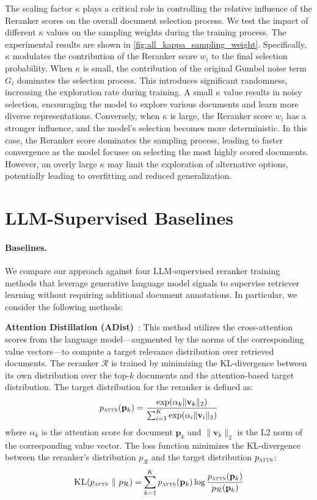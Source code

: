 The scaling factor \(\kappa\) plays a critical role in controlling the relative influence of the Reranker scores on the overall document selection process. We test the impact of different \(\kappa\) values on the sampling weights during the training process. The experimental results are shown in \autoref{fig:all_kappa_sampling_weight}. Specifically, \(\kappa\) modulates the contribution of the Reranker score \(w_i\) to the final selection probability. When \(\kappa\) is small, the contribution of the original Gumbel noise term \(G_i\) dominates the selection process. This introduces significant randomness, increasing the exploration rate during training. A small \(\kappa\) value results in noisy selection, encouraging the model to explore various documents and learn more diverse representations. Conversely, when \(\kappa\) is large, the Reranker score \(w_i\) has a stronger influence, and the model’s selection becomes more deterministic. In this case, the Reranker score dominates the sampling process, leading to faster convergence as the model focuses on selecting the most highly scored documents. However, an overly large \(\kappa\) may limit the exploration of alternative options, potentially leading to overfitting and reduced generalization.



\section{LLM-Supervised Baselines} \label{sec: appendix_baseline}
\paragraph{Baselines.}
We compare our approach against four LLM-supervised reranker training methods that leverage generative language model signals to supervise retriever learning without requiring additional document annotations. In particular, we consider the following methods:

\textbf{Attention Distillation (ADist)}~\cite{DBLP:conf/iclr/IzacardG21}: This method utilizes the cross-attention scores from the language model—augmented by the norms of the corresponding value vectors—to compute a target relevance distribution over retrieved documents. The reranker $\mathcal{R}$ is trained by minimizing the KL-divergence between its own distribution over the top-$k$ documents and the attention-based target distribution. The target distribution for the reranker is defined as:
\[
p_{\textsc{attn}}(\mathbf{p}_k) = \frac{\exp(\alpha_k \| \mathbf{v}_k \|_2)}{\sum_{i=1}^K \exp(\alpha_i \| \mathbf{v}_i \|_2)}
\]
where $\alpha_k$ is the attention score for document $\mathbf{p}_k$ and $\|\mathbf{v}_k\|_2$ is the L2 norm of the corresponding value vector. The loss function minimizes the KL-divergence between the reranker's distribution $p_{\mathcal{R}}$ and the target distribution $p_{\textsc{attn}}$:
\[
\textsc{KL}(p_{\textsc{attn}} \ \| \ p_{\mathcal{R}}) = \sum_{k=1}^K p_{\textsc{attn}} (\mathbf{p}_k) \log \frac{p_{\textsc{attn}} (\mathbf{p}_k)}{p_{\mathcal{R}} (\mathbf{p}_k)}
\]

